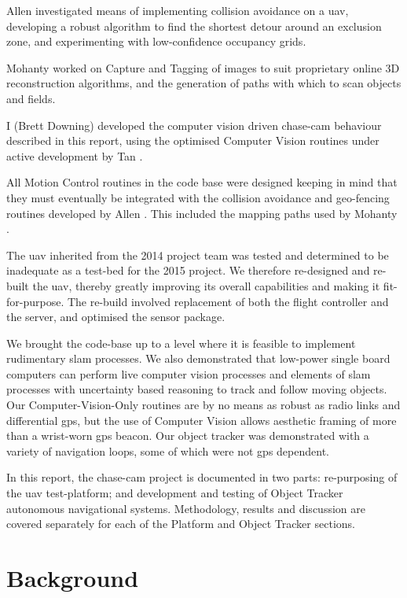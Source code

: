 \documentclass[a4paper, 11pt, titlepage]{article}
\begin{document}
    Allen \cite{Allen} investigated means of implementing collision avoidance on a \gls{uav}, developing a robust algorithm to find the shortest detour around an exclusion zone, and experimenting with low-confidence occupancy grids. 
    
    Mohanty \cite{Mohanty} worked on Capture and Tagging of images to suit proprietary online 3D reconstruction algorithms, and the generation of paths with which to scan objects and fields.

    I (Brett Downing) \cite{Downing} developed the computer vision driven chase-cam behaviour described in this report, using the optimised Computer Vision routines under active development by Tan \cite{Tan}.
    
    All Motion Control routines in the code base were designed keeping in mind that they must eventually be integrated with the collision avoidance and geo-fencing routines developed by Allen \cite{Allen}. This included the mapping paths used by Mohanty \cite{Mohanty}.

    The \gls{uav} inherited from the 2014 project team was tested and determined to be inadequate as a test-bed for the 2015 project. We therefore re-designed and re-built the \gls{uav}, thereby greatly improving its overall capabilities and making it fit-for-purpose. The re-build involved replacement of both the flight controller and the server, and optimised the sensor package. 

    We brought the code-base up to a level where it is feasible to implement rudimentary \gls{slam} processes.  We also demonstrated that low-power single board computers can perform live computer vision processes and elements of \gls{slam} processes with uncertainty based reasoning to track and follow moving objects. Our Computer-Vision-Only routines are by no means as robust as radio links and differential \gls{gps}, but the use of Computer Vision allows aesthetic framing of more than a wrist-worn \gls{gps} beacon. Our object tracker was demonstrated with a variety of navigation loops, some of which were not \gls{gps} dependent.

    In this report, the chase-cam project is documented in two parts: re-purposing of the \gls{uav} test-platform; and development and testing of Object Tracker autonomous navigational systems. Methodology, results and discussion are covered separately for each of the Platform and Object Tracker sections.

  \section{Background}
\end{document}
